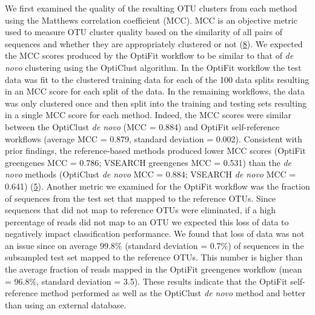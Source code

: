 \documentclass[
]{article}
\begin{document}
We first examined the quality of the resulting OTU clusters from each
method using the Matthews correlation coefficient (MCC). MCC is an
objective metric used to measure OTU cluster quality based on the
similarity of all pairs of sequences and whether they are appropriately
clustered or not (\protect\hyperlink{ref-westcott2015}{8}). We expected
the MCC scores produced by the OptiFit workflow to be similar to that of
\emph{de novo} clustering using the OptiClust algorithm. In the OptiFit
workflow the test data was fit to the clustered training data for each
of the 100 data splits resulting in an MCC score for each split of the
data. In the remaining workflows, the data was only clustered once and
then split into the training and testing sets resulting in a single MCC
score for each method. Indeed, the MCC scores were similar between the
OptiClust \emph{de novo} (MCC = 0.884) and OptiFit self-reference
workflows (average MCC = 0.879, standard deviation = 0.002). Consistent
with prior findings, the reference-based methods produced lower MCC
scores (OptiFit greengenes MCC = 0.786; VSEARCH greengenes MCC = 0.531)
than the \emph{de novo} methods (OptiClust \emph{de novo} MCC = 0.884;
VSEARCH \emph{de novo} MCC = 0.641)
(\protect\hyperlink{ref-sovacool2022}{5}). Another metric we examined
for the OptiFit workflow was the fraction of sequences from the test set
that mapped to the reference OTUs. Since sequences that did not map to
reference OTUs were eliminated, if a high percentage of reads did not
map to an OTU we expected this loss of data to negatively impact
classification performance. We found that loss of data was not an issue
since on average 99.8\% (standard deviation = 0.7\%) of sequences in the
subsampled test set mapped to the reference OTUs. This number is higher
than the average fraction of reads mapped in the OptiFit greengenes
workflow (mean = 96.8\%, standard deviation = 3.5). These results
indicate that the OptiFit self-reference method performed as well as the
OptiClust \emph{de novo} method and better than using an external
database.
\end{document}
